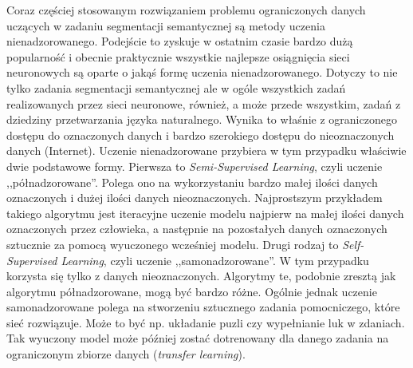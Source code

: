 \documentclass{classrep}
\begin{document}
{        %
        Coraz częściej stosowanym rozwiązaniem problemu ograniczonych danych uczących w zadaniu segmentacji
        semantycznej są metody uczenia nienadzorowanego. Podejście to zyskuje w ostatnim czasie bardzo dużą
        popularność i obecnie praktycznie wszystkie najlepsze osiągnięcia sieci neuronowych są oparte o
        jakąś formę uczenia nienadzorowanego. Dotyczy to nie tylko zadania segmentacji semantycznej ale w
        ogóle wszystkich zadań realizowanych przez sieci neuronowe, również, a może przede wszystkim, zadań
        z dziedziny przetwarzania języka naturalnego. Wynika to właśnie z ograniczonego dostępu do
        oznaczonych danych i bardzo szerokiego dostępu do nieoznaczonych danych (Internet). Uczenie
        nienadzorowane przybiera w tym przypadku właściwie dwie podstawowe formy. Pierwsza to
        \emph{Semi-Supervised Learning}, czyli uczenie ,,półnadzorowane''. Polega ono na wykorzystaniu
        bardzo małej ilości danych oznaczonych i dużej ilości danych nieoznaczonych. Najprostszym przykładem
        takiego algorytmu jest iteracyjne uczenie modelu najpierw na małej ilości danych oznaczonych przez
        człowieka, a następnie na pozostałych danych oznaczonych sztucznie za pomocą wyuczonego wcześniej
        modelu. Drugi rodzaj to \emph{Self-Supervised Learning}, czyli uczenie ,,samonadzorowane''. W tym
        przypadku korzysta się tylko z danych nieoznaczonych. Algorytmy te, podobnie zresztą jak algorytmu
        półnadzorowane, mogą być bardzo różne. Ogólnie jednak uczenie samonadzorowane polega na stworzeniu
        sztucznego zadania pomocniczego, które sieć rozwiązuje. Może to być np. układanie puzli czy
        wypełnianie luk w zdaniach. Tak wyuczony model może później zostać dotrenowany dla danego zadania na
        ograniczonym zbiorze danych (\emph{transfer learning}).

    }
\end{document}
